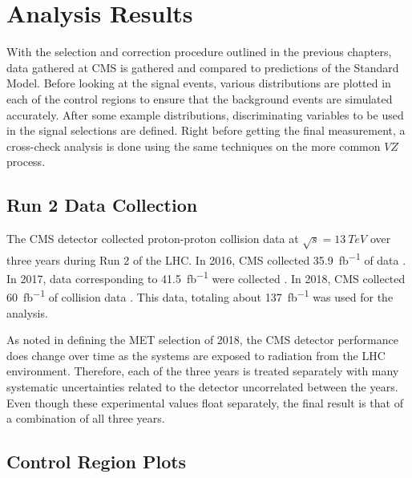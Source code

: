 \chapter{Analysis Results} \label{ch:results}

With the selection and correction procedure outlined in the previous chapters,
data gathered at CMS is gathered and compared to predictions of the Standard Model.
Before looking at the signal events, various distributions are plotted
in each of the control regions to ensure that the background events are simulated accurately.
After some example distributions, discriminating variables to be used in the signal selections are defined.
Right before getting the final measurement, a cross-check analysis is done using the same techniques
on the more common $V\!Z$ process.

\section{Run 2 Data Collection}

The CMS detector collected proton-proton collision data at $\sqrt{s} = \SI{13}{TeV}$
over three years during Run 2 of the LHC.
In 2016, CMS collected \SI{35.9}{fb^{-1}} of data \cite{CMS-PAS-LUM-17-001}.
In 2017, data corresponding to \SI{41.5}{fb^{-1}} were collected \cite{CMS-PAS-LUM-17-004}.
In 2018, CMS collected \SI{60}{fb^{-1}} of collision data \cite{CMS-PAS-LUM-18-002}.
This data, totaling about \SI{137}{fb^{-1}} was used for the analysis.

As noted in defining the MET selection of 2018, the CMS detector performance does
change over time as the systems are exposed to radiation from the LHC environment.
Therefore, each of the three years is treated separately with many systematic uncertainties related to the
detector uncorrelated between the years.
Even though these experimental values float separately, the final result is that of a combination of all three years.

\section{Control Region Plots}

